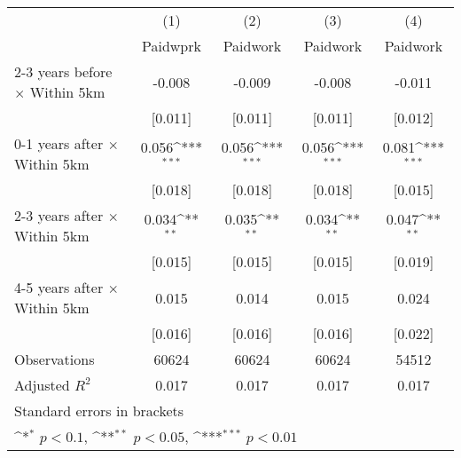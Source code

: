 {
\def\sym#1{\ifmmode^{#1}\else\(^{#1}\)\fi}
\begin{tabular}{l*{4}{c}}
\hline\hline
                    &\multicolumn{1}{c}{(1)}&\multicolumn{1}{c}{(2)}&\multicolumn{1}{c}{(3)}&\multicolumn{1}{c}{(4)}\\
                    &\multicolumn{1}{c}{Paidwprk}&\multicolumn{1}{c}{Paidwork}&\multicolumn{1}{c}{Paidwork}&\multicolumn{1}{c}{Paidwork}\\
\hline
2-3 years before $\times$ Within 5km&      -0.008         &      -0.009         &      -0.008         &      -0.011         \\
                    &     [0.011]         &     [0.011]         &     [0.011]         &     [0.012]         \\
0-1 years after $\times$ Within 5km&       0.056\sym{***}&       0.056\sym{***}&       0.056\sym{***}&       0.081\sym{***}\\
                    &     [0.018]         &     [0.018]         &     [0.018]         &     [0.015]         \\
2-3 years after $\times$ Within 5km&       0.034\sym{**} &       0.035\sym{**} &       0.034\sym{**} &       0.047\sym{**} \\
                    &     [0.015]         &     [0.015]         &     [0.015]         &     [0.019]         \\
4-5 years after $\times$ Within 5km&       0.015         &       0.014         &       0.015         &       0.024         \\
                    &     [0.016]         &     [0.016]         &     [0.016]         &     [0.022]         \\
\hline
Observations        &       60624         &       60624         &       60624         &       54512         \\
Adjusted \(R^{2}\)  &       0.017         &       0.017         &       0.017         &       0.017         \\
\hline\hline
\multicolumn{5}{l}{\footnotesize Standard errors in brackets}\\
\multicolumn{5}{l}{\footnotesize \sym{*} \(p<0.1\), \sym{**} \(p<0.05\), \sym{***} \(p<0.01\)}\\
\end{tabular}
}
